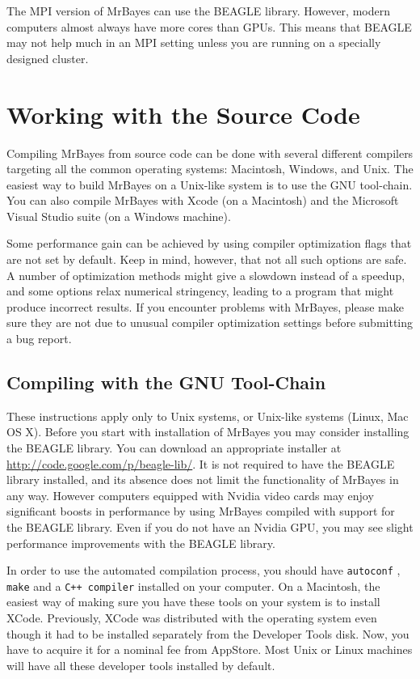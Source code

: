 \documentclass[12pt]{book}
\newcommand{\ttt}[1]{\texttt{#1} }
\begin{document}
The MPI version of MrBayes can use the BEAGLE library. However, modern computers almost always have
more cores than GPUs. This means that BEAGLE may not help much in an MPI setting unless
you are running on a specially designed cluster.


\section{Working with the Source Code}
Compiling MrBayes from source code can be done with several different compilers targeting
all the common operating systems: Macintosh, Windows, and Unix. The easiest way to build MrBayes on a
Unix-like system is to use the GNU tool-chain. You can also compile MrBayes with Xcode (on a Macintosh)
and the Microsoft Visual Studio suite (on a Windows machine).

Some performance gain can be achieved by using compiler optimization flags that are not set by default.
Keep in mind, however, that not all such options are safe. A number of optimization methods might give a
slowdown instead of a speedup, and some options relax numerical stringency, leading to a program that
might produce incorrect results. If you encounter problems with MrBayes, please make sure they are not
due to unusual compiler optimization settings before submitting a bug report.

\subsection{Compiling with the GNU Tool-Chain}
These instructions apply only to Unix systems, or Unix-like systems (Linux, Mac OS X). Before you start
with installation of MrBayes you may consider installing the BEAGLE library. You can
download an appropriate installer at \url{http://code.google.com/p/beagle-lib/}. It is not required to have
the BEAGLE library installed, and its absence does not limit the functionality of MrBayes in any 
way. However computers equipped with Nvidia video cards may enjoy significant boosts in performance
by using MrBayes compiled with support for the BEAGLE library. Even if you do not have an Nvidia GPU,
you may see slight performance improvements with the BEAGLE library.  

In order to use the automated compilation process, you should have \ttt{autoconf}, \ttt{make} and a \ttt{C++ 
compiler} installed on your computer. On a Macintosh, the easiest way of making sure you have these
tools on your system is to install XCode. Previously, XCode was distributed with the operating system even
though it had to be installed separately from the Developer Tools disk. Now, you have to acquire it for a
nominal fee from AppStore. Most Unix or Linux machines will have all these developer tools installed by default.
\end{document}
